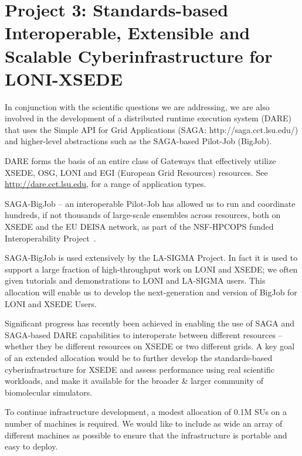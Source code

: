 \documentclass[a4paper,11pt]{article}
\begin{document}
\section{Project 3: Standards-based Interoperable, Extensible and Scalable Cyberinfrastructure for LONI-XSEDE}

In conjunction with the scientific questions we are addressing, we are also involved in the development of a distributed runtime execution system (DARE) that uses the Simple API for Grid Applications (SAGA: http://saga.cct.lsu.edu/)
and higher-level abstractions such as the SAGA-based Pilot-Job (BigJob).

DARE forms the basis of an entire class of Gateways that effectively utilize XSEDE, OSG, LONI and EGI (European Grid Resources) resources. See \url{http://dare.cct.lsu.edu}, for a range of application types.

SAGA-BigJob -- an interoperable Pilot-Job has allowed us to run and coordinate hundreds, if not thousands of large-scale ensembles across resources, both on XSEDE and the EU DEISA network, as part of the NSF-HPCOPS funded Interoperability Project~\cite{tg-vph-interop}.  

SAGA-BigJob is used extensively by the LA-SIGMA Project. In fact it is used to support a large fraction of high-throughput work on LONI and XSEDE; we often given tutorials and demonstrations to LONI and LA-SIGMA users. This allocation will enable us to develop the next-generation and version of BigJob for LONI and XSEDE Users.

Significant progress has recently been achieved in enabling the use of SAGA and SAGA-based DARE capabilities to interoperate between different resources -- whether they be different resources on XSEDE or two different grids.  A key goal of an extended allocation would be to further develop the standards-based cyberinfrastructure for XSEDE and assess performance using real scientific workloads, and make it available for the broader \& larger community of biomolecular simulators.

To continue infrastructure development, a modest allocation of 0.1M SUs on a number of machines is required. We would like to include as wide an array of different machines as possible to ensure that the infrastructure is portable and easy to deploy. %
\end{document}
